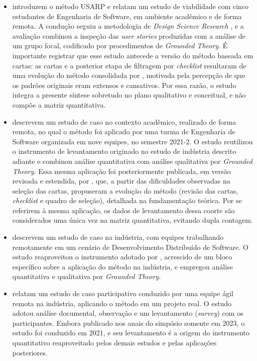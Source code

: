 \begin{itemize}
    \item \textbf{} introduzem o método USARP e relatam um estudo de viabilidade com cinco estudantes de Engenharia de Software, em ambiente acadêmico e de forma remota. A condução seguiu a metodologia de \textit{Design Science Research} \cite{wieringa2009}, e a avaliação combinou a inspeção das \textit{user stories} produzidas com a análise de um grupo focal, codificado por procedimentos de \textit{Grounded Theory}. É importante registrar que esse estudo antecede a versão do método baseada em cartas: as cartas e a posterior etapa de filtragem por \textit{checklist} resultaram de uma evolução do método consolidada por , motivada pela percepção de que os padrões originais eram extensos e cansativos. Por essa razão, o estudo integra a presente síntese sobretudo no plano qualitativo e conceitual, e não compõe a matriz quantitativa.
    \item \textbf{} descrevem um estudo de caso no contexto acadêmico, realizado de forma remota, no qual o método foi aplicado por uma turma de Engenharia de Software organizada em nove equipes, no semestre 2021-2. O estudo reutilizou o instrumento de levantamento originado no estudo de indústria descrito adiante e combinou análise quantitativa com análise qualitativa por \textit{Grounded Theory}. Essa mesma aplicação foi posteriormente publicada, em versão revisada e estendida, por , que, a partir das dificuldades observadas na seleção das cartas, propuseram a evolução do método (revisão das cartas, \textit{checklist} e quadro de seleção), detalhada na fundamentação teórica. Por se referirem à mesma aplicação, os dados de levantamento dessa coorte são considerados uma única vez na matriz quantitativa, evitando dupla contagem.
    \item \textbf{} descrevem um estudo de caso na indústria, com equipes trabalhando remotamente em um cenário de Desenvolvimento Distribuído de Software. O estudo reaproveitou o instrumento adotado por , acrescido de um bloco específico sobre a aplicação do método na indústria, e empregou análise quantitativa e qualitativa por \textit{Grounded Theory}.
    \item \textbf{} relatam um estudo de caso participativo conduzido por uma equipe ágil remota na indústria, aplicando o método em um projeto real. O estudo adotou análise documental, observação e um levantamento (\textit{survey}) com os participantes. Embora publicado nos anais do simpósio somente em 2023, o estudo foi conduzido em 2021, e seu levantamento é a origem do instrumento quantitativo reaproveitado pelos demais estudos e pelas aplicações posteriores.
\end{itemize}

